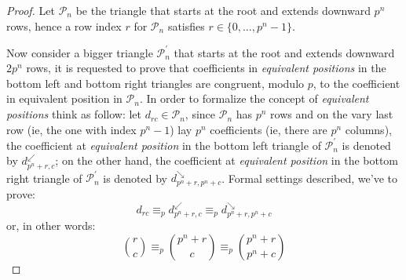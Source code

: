 \documentclass[10pt,a4paper]{article} %
\begin{document}
    \begin{proof}
      Let $\mathcal{P}_n$ be the triangle that starts at the root and
      extends downward $p^n$ rows, hence a row index $r$ for
      $\mathcal{P}_n$ satisfies
      $r \in \lbrace 0, \ldots, p^n -1 \rbrace$.
        
      Now consider a bigger triangle $\mathcal{P}_n^\prime$ that
      starts at the root and extends downward $2p^n$ rows, it is
      requested to prove that coefficients in \emph{equivalent
        positions} in the bottom left and bottom right triangles are
      congruent, modulo $p$, to the coefficient in equivalent position
      in $\mathcal{P}_n$. In order to formalize the concept of
      \emph{equivalent positions} think as follow: let
      $d_{rc}\in\mathcal{P}_n$, since $\mathcal{P}_{n}$ has $p^n$ rows
      and on the vary last row (ie, the one with index $p^n-1$) lay
      $p^n$ coefficients (ie, there are $p^n$ columns), the
      coefficient at \emph{equivalent position} in the bottom left
      triangle of $\mathcal{P}_{n}^\prime$ is denoted by
      $d_{p^n+r, c}^{\swarrow}$; on the other hand, the coefficient at
      \emph{equivalent position} in the bottom right triangle of
      $\mathcal{P}_{n}^\prime$ is denoted by
      $d_{p^n+r, p^n+c}^{\searrow}$.  Formal settings described, we've
      to prove:
      \begin{displaymath}
        d_{rc} \equiv_p d_{p^n+r,c}^{\swarrow} \equiv_p d_{p^n+r,p^n+c}^{\searrow} 
      \end{displaymath}
      or, in other words:
      \begin{displaymath}
        {{r} \choose {c}} \equiv_p {{p^n+r} \choose {c}} \equiv_p {{p^n+r} \choose {p^n+c}} 
      \end{displaymath}


\end{proof}
\end{document}
